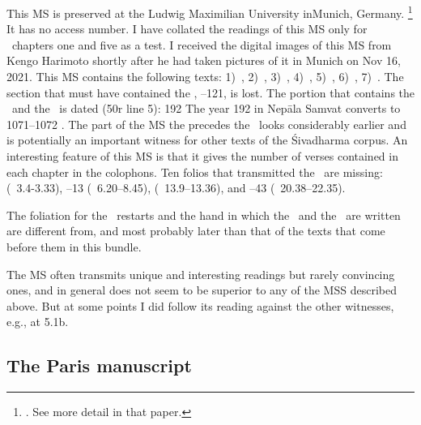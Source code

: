 This MS is preserved at the Ludwig Maximilian University
in\linebreak \mbox{Munich}, Germany.%
			\footnote{. 
			See more detail in that paper.}
It has no access number.
I have collated the readings of this MS only for \VSS\ 
chapters one and five as a test.
I received the digital images of this MS from Kengo Harimoto
shortly after he had taken pictures of it in Munich on  Nov 16, 2021. 
This MS contains the following texts:
1)~\SDhS, 
2)~\SDhU, 
3)~\Ums,
4)~\SivaUp,
5)~\Vss, 
6)~\Uums,
7)~\DharmP.
The section that must have contained the \SDhSangr, --121, is lost. 
The portion that contains the \VSS\ and the \DharmP\
is dated (\fol50r line 5):  192  The year 192 in Nepāla Samvat converts to 
1071--1072 \CE. The part of the MS the precedes the \VSS\ looks
considerably earlier and is potentially an important witness for
other texts of the Śivadharma corpus. An interesting 
feature of this MS is that it gives the number of verses contained in
each chapter in the colophons. Ten folios that transmitted the \VSS\
are missing: 
\fol5 (\VSS\ 3.4-3.33),
\fols11--13 (\VSS\ 6.20--8.45),
\fols24 (\VSS\ 13.9--13.36), and
\fols39--43 (\VSS\ 20.38--22.35). 

The foliation for the \VSS\ restarts
and the hand in which the \VSS\ and the \DharmP\ are written are different from, and
most probably later than that of the texts that come 
before them in this bundle. 

The MS often transmits unique and interesting readings
but rarely convincing ones, and in general does not seem to be superior 
to any of the MSS described above. But at some points
I did follow its reading against the other witnesses, e.g., at 5.1b.


\medskip
\subsection{The Paris manuscript}

